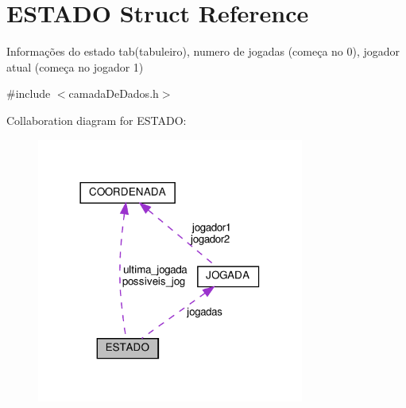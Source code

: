 \hypertarget{structESTADO}{}\section{E\+S\+T\+A\+DO Struct Reference}
\label{structESTADO}


Informações do estado tab(tabuleiro), numero de jogadas (começa no 0), jogador atual (começa no jogador 1)  




{\ttfamily \#include $<$camada\+De\+Dados.\+h$>$}



Collaboration diagram for E\+S\+T\+A\+DO\+:\nopagebreak
\begin{figure}[H]
\begin{center}
\leavevmode
\includegraphics[width=249pt]{structESTADO__coll__graph}
\end{center}
\end{figure}
